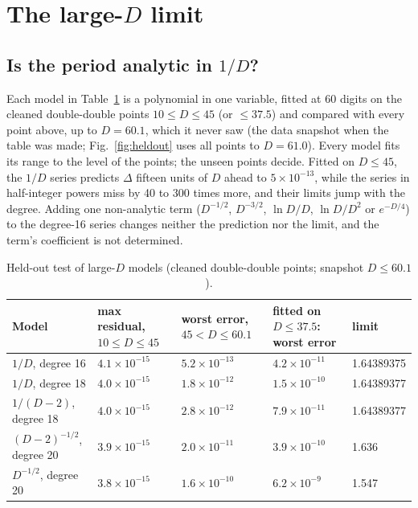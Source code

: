 \documentclass[aps,prd,onecolumn,superscriptaddress,nofootinbib,10pt]{revtex4-2}
\begin{document}
\section{The large-$D$ limit}
\label{sec:limit}

\subsection{Is the period analytic in $1/D$?}

Each model in Table~\ref{tab:analytic} is a polynomial in one variable, fitted at 60 digits on the cleaned
double-double points $10 \le D \le 45$ (or $\le 37.5$) and compared with every point above, up to $D = 60.1$, which it
never saw (the data snapshot when the table was made; Fig.~\ref{fig:heldout} uses all points to $D = 61.0$). Every
model fits its range to the level of the points; the unseen points decide. Fitted on $D \le 45$, the $1/D$ series
predicts $\Delta$ fifteen units of $D$ ahead to $5\times10^{-13}$, while the series in half-integer powers miss by 40 to
300 times more, and their limits jump with the degree. Adding one non-analytic term ($D^{-1/2}$, $D^{-3/2}$,
$\ln D/D$, $\ln D/D^2$ or $e^{-D/4}$) to the degree-16 series changes neither the prediction nor the limit, and the
term's coefficient is not determined.

\begin{table}[t]
\caption{Held-out test of large-$D$ models (cleaned double-double points; snapshot $D \le 60.1$).}
\label{tab:analytic}
\footnotesize
\begin{ruledtabular}
\begin{tabular}{lllll}
Model & max residual, $10 \le D \le 45$ & worst error, $45 < D \le 60.1$ & fitted on $D \le 37.5$: worst error & limit \\ \hline
$1/D$, degree 16 & $4.1\times10^{-15}$ & $5.2\times10^{-13}$ & $4.2\times10^{-11}$ & 1.64389375 \\
$1/D$, degree 18 & $4.0\times10^{-15}$ & $1.8\times10^{-12}$ & $1.5\times10^{-10}$ & 1.64389377 \\
$1/(D-2)$, degree 18 & $4.0\times10^{-15}$ & $2.8\times10^{-12}$ & $7.9\times10^{-11}$ & 1.64389377 \\
$(D-2)^{-1/2}$, degree 20 & $3.9\times10^{-15}$ & $2.0\times10^{-11}$ & $3.9\times10^{-10}$ & 1.636 \\
$D^{-1/2}$, degree 20 & $3.8\times10^{-15}$ & $1.6\times10^{-10}$ & $6.2\times10^{-9}$ & 1.547 \\
\end{tabular}
\end{ruledtabular}
\end{table}
\end{document}
